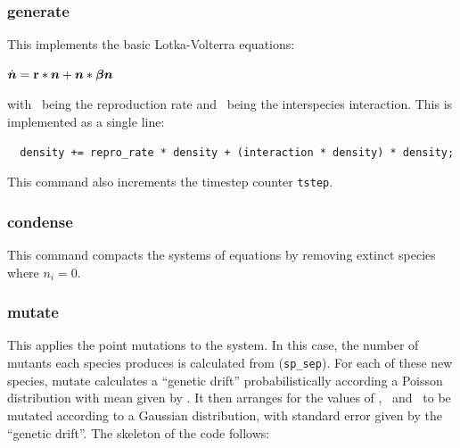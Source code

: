 \subsubsection{generate}

This implements the basic Lotka-Volterra equations:

\begin{math}
\dot{\mbox{\boldmath{$n$}}} = \mbox{${\bf r}$}*\mbox{\boldmath{$n$}} + \mbox{\boldmath{$n$}}*\mbox{\boldmath{$\beta$}}\mbox{\boldmath{$n$}}
\end{math}

with \br\ being the reproduction rate and \bbeta\ being the
interspecies interaction. This is implemented as a single line:

\begin{verbatim}
  density += repro_rate * density + (interaction * density) * density;
\end{verbatim}

This command also increments the timestep counter {\tt tstep}.

\subsubsection{condense}\label{condense}

This command compacts the systems of equations by removing extinct
species where $n_i=0$.

\subsubsection{mutate}\label{mutate}

This applies the point mutations to the system. In this case, the
number of mutants each species produces is calculated from
(\verb|sp_sep|)\br\bmu\bn. For each of these new species, mutate
calculates a ``genetic drift'' probabilistically according a Poisson
distribution with mean given by \bmu. It then arranges for the values
of \br, \bbeta\ and \bmu\ to be mutated according to a Gaussian
distribution, with standard error given by the ``genetic drift''. The
skeleton of the code follows:

